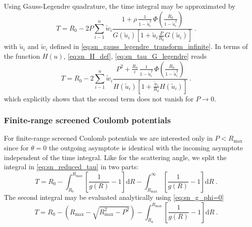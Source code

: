 Using Gauss-Legendre quadrature, the time integral may be approximated by
%
\begin{equation}
    \label{eq:sn_tau_G_legendre}
    T = R_0 - 2 P \sum_{i-1}^n \tilde{w}_i
        \frac{ 1 + \rho \, \frac{ 1 }{ 1-\tilde{u}_i^2 } \, \Phi \left( \frac{R_0}{1-\tilde{u}_i^2} \right) }{
        G(\tilde{u}_i) \left[ 1 + \tilde{u}_i \frac{P}{R_0} G(\tilde{u}_i) \right] } ~.
\end{equation}
%
with $\tilde{u}_i$ and $\tilde{w}_i$ defined in \cref{eq:sn_gauss_legendre_transform_infinite}.
In terms of the function $H(u)$, \cref{eq:sn_H_def}, \cref{eq:sn_tau_G_legendre} reads
%
\begin{equation}
    \label{eq:sn_tau_H_legendre}
        T = R_0 - 2 \sum_{i-1}^n \tilde{w}_i
        \frac{ P^2 + \frac{R_0}{\varepsilon} \, \frac{ 1 }{ 1-\tilde{u}_i^2 } \, \Phi \left( \frac{R_0}{1-\tilde{u}_i^2} \right) }{
        H(\tilde{u}_i) \left[ 1 + \frac{\tilde{u}_i}{R_0} H(\tilde{u}_i) \right] } ~.
\end{equation}
%
which explicitly shows that the second term does not vanish for $P \rightarrow 0$.

\subsubsection{Finite-range screened Coulomb potentials}
%
For finite-range screened Coulomb potentials we are interested only in $P < R_\mathrm{max}$ since for $\theta = 0$ the outgoing asymptote is identical with the incoming asymptote independent of the time integral.
Like for the scattering angle, we split the integral in \cref{eq:sn_reduced_tau} in two parts:
%
\begin{equation}
    \label{eq:sn_reduced_tau_finite}
    T = R_0 -
        \int_{R_0}^{R_\mathrm{max}} \left[ \frac{ 1 }{ g(R) } - 1 \right] \mathrm{d}R -
        \int_{R_\mathrm{max}}^\infty \left[ \frac{ 1 }{ g(R) } - 1 \right] \mathrm{d}R ~.
\end{equation}
%
The second integral may be evaluated analytically using \cref{eq:sn_g_phi=0}
%
\begin{equation}
    T = R_0 -
        (R_\mathrm{max} - \sqrt{ R_\mathrm{max}^2 - P^2 }) -
        \int_{R_0}^{R_\mathrm{max}} \left[ \frac{ 1 }{ g(R) } - 1 \right] \mathrm{d}R ~.
\end{equation}

